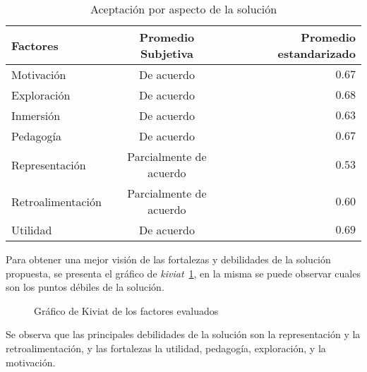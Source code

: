 \begin{table}[!hbt]
\centering
\begin{tabular}{lcr}
\toprule
Factores        & Promedio Subjetiva      & Promedio estandarizado \\
\midrule
Motivación        & De acuerdo              & $0.67$  \\
Exploración       & De acuerdo              & $0.68$  \\
Inmersión         & De acuerdo              & $0.63$  \\
Pedagogía         & De acuerdo              & $0.67$  \\
Representación    & Parcialmente de acuerdo & $0.53$  \\
Retroalimentación & Parcialmente de acuerdo & $0.60$  \\
Utilidad          & De acuerdo              & $0.69$  \\
\bottomrule
\end{tabular}
\caption{Aceptación por aspecto de la solución}
\label{tab:resultado_resumen_aspectos_aceptacion}
\end{table}

Para  obtener una mejor visión de las fortalezas y debilidades de la solución
propuesta, se presenta el gráfico de \emph{kiviat}~\ref{fig:subjetiva_kiviat},
en la misma se puede observar cuales son los puntos débiles de la solución.

\begin{figure}[!ht]
\label{fig:subjetiva_kiviat}
\caption{Gráfico de Kiviat de los factores evaluados}
\end{figure}

Se observa que las principales debilidades de la solución son la representación
y la retroalimentación, y las fortalezas la utilidad, pedagogía, exploración, y
la motivación.

